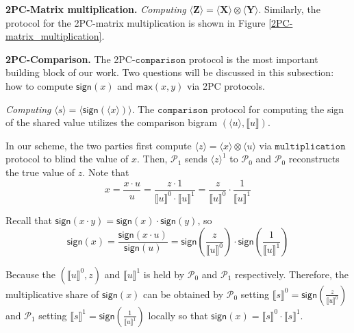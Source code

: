 \documentclass[letterpaper]{article} %
\begin{document}
    \textbf{2PC-Matrix multiplication.}
    \emph{Computing} $ \langle \mathbf{Z}\rangle  = \langle \mathbf{X}\rangle  \otimes \langle \mathbf{Y}\rangle$.
    Similarly, the protocol for the 2PC-matrix multiplication is shown in Figure \ref{2PC-matrix_multiplication}.

    \textbf{2PC-Comparison.}
    The 2PC-$\mathtt{comparison}$ protocol is the most important building block of our work.
    Two questions will be discussed in this subsection:
    how to compute $\mathsf{sign}(x)$ and $\mathsf{max}(x,y)$ via 2PC protocols.


    \emph{Computing} $\langle s\rangle  = \langle \mathsf{sign}(\langle x\rangle)\rangle $.
    The $\mathtt{comparison}$ protocol for computing the sign of the shared value utilizes the comparison bigram $(\langle u\rangle,\llbracket u \rrbracket )$.

    In our scheme, the two parties first compute $ \langle z\rangle = \langle x\rangle\otimes \langle u\rangle$
    via $\mathtt{multiplication}$ protocol
    to blind the value of $x$.
    Then, $\mathcal{P}_{1}$ sends  $ \langle z\rangle^{1}$ to $\mathcal{P}_{0}$ and
    $\mathcal{P}_{0}$ reconstructs the true value of $z$.
    Note that
    $$x=\frac{x\cdot u}{u}
        =\frac{z\cdot 1}{\llbracket u \rrbracket^{0}\cdot \llbracket u \rrbracket^{1}}
        =\frac{z}{\llbracket u \rrbracket^{0}}\cdot\frac{1}{\llbracket u \rrbracket^{1}}$$

    Recall that $\mathsf{sign}(x\cdot y)=\mathsf{sign}(x)\cdot \mathsf{sign}(y)$, so
    $$\mathsf{sign}(x)=\frac{\mathsf{sign}(x \cdot u)}{\mathsf{sign}(u)}
    =\mathsf{sign}(\frac{z}{\llbracket u \rrbracket^{0}})
    \cdot \mathsf{sign}(\frac{1}{\llbracket u \rrbracket^{1}})$$

    Because the $(\llbracket u \rrbracket^{0},z)$ and $\llbracket u \rrbracket^{1}$
    is held by $\mathcal{P}_{0}$ and $\mathcal{P}_{1}$ respectively.
    Therefore, the multiplicative share of $\mathsf{sign}(x)$ can be obtained by
    $\mathcal{P}_{0}$ setting $\llbracket s \rrbracket^{0}
    =\mathsf{sign}(\frac{z}{\llbracket u \rrbracket^{0}})$
    and $\mathcal{P}_{1}$ setting $\llbracket s \rrbracket^{1}
    =\mathsf{sign}(\frac{1}{\llbracket u \rrbracket^{1}})$ locally
    so that $\mathsf{sign}(x)=\llbracket s \rrbracket^{0}\cdot \llbracket s \rrbracket^{1}$.
\end{document}
